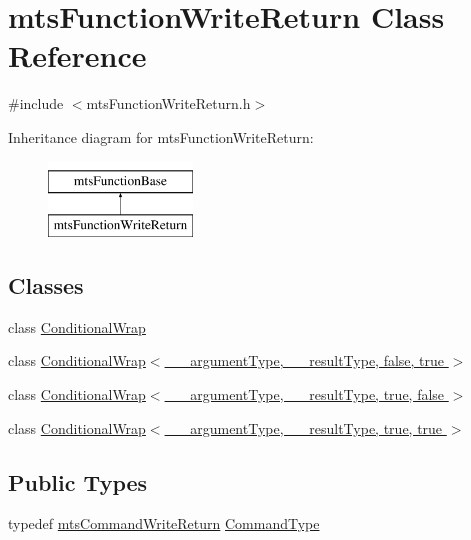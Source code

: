 \hypertarget{classmts_function_write_return}{}\section{mts\+Function\+Write\+Return Class Reference}
\label{classmts_function_write_return}


{\ttfamily \#include $<$mts\+Function\+Write\+Return.\+h$>$}

Inheritance diagram for mts\+Function\+Write\+Return\+:\begin{figure}[H]
\begin{center}
\leavevmode
\includegraphics[height=2.000000cm]{d5/df9/classmts_function_write_return}
\end{center}
\end{figure}
\subsection*{Classes}
\begin{DoxyCompactItemize}
\item 
class \hyperlink{classmts_function_write_return_1_1_conditional_wrap}{Conditional\+Wrap}
\item 
class \hyperlink{classmts_function_write_return_1_1_conditional_wrap_3_01____argument_type_00_01____result_type_00_01false_00_01true_01_4}{Conditional\+Wrap$<$ \+\_\+\+\_\+argument\+Type, \+\_\+\+\_\+result\+Type, false, true $>$}
\item 
class \hyperlink{classmts_function_write_return_1_1_conditional_wrap_3_01____argument_type_00_01____result_type_00_01true_00_01false_01_4}{Conditional\+Wrap$<$ \+\_\+\+\_\+argument\+Type, \+\_\+\+\_\+result\+Type, true, false $>$}
\item 
class \hyperlink{classmts_function_write_return_1_1_conditional_wrap_3_01____argument_type_00_01____result_type_00_01true_00_01true_01_4}{Conditional\+Wrap$<$ \+\_\+\+\_\+argument\+Type, \+\_\+\+\_\+result\+Type, true, true $>$}
\end{DoxyCompactItemize}
\subsection*{Public Types}
\begin{DoxyCompactItemize}
\item 
typedef \hyperlink{classmts_command_write_return}{mts\+Command\+Write\+Return} \hyperlink{classmts_function_write_return_ac896d3571d680531a898daf398774881}{Command\+Type}
\end{DoxyCompactItemize}
